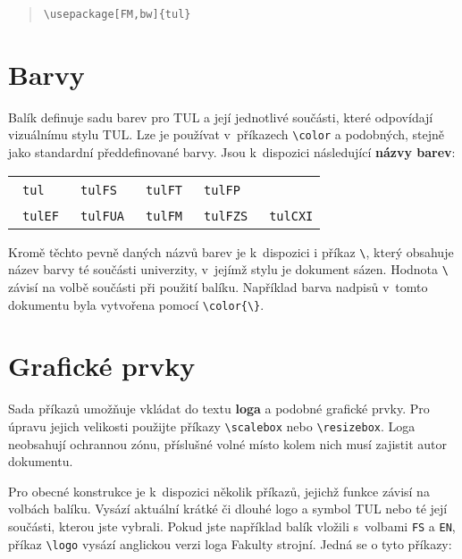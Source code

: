 \documentclass[a4paper,12pt,fonts,numbering]{./tulpackage/tularticle}
\makeatletter
\newcommand{\cmdfont}[1]{\texttt{\color{\tulcolor}#1}}
\newcommand{\cmdnoindex}[1]{\cmdfont{\textbackslash #1}}
\newcommand{\cmd}[1]{\cmdnoindex{#1}\index{#1@\textbackslash #1}}
\newcommand{\demobox}{\raisebox{-.20ex}{\rule{1em}{1em}}}
\makeatother
\begin{document}
\begin{quote}
\cmdnoindex{usepackage[FM,bw]\{tul\}}
\end{quote}

\section{Barvy}

Balík definuje sadu barev pro TUL a její jednotlivé součásti, které odpovídají
vizuálnímu stylu TUL. Lze je používat v~příkazech \cmdnoindex{color} a podobných,
stejně jako standardní předdefinované barvy. Jsou k~dispozici následující
\textbf{názvy barev}:

\begin{center}
\begin{tabular}{l@{\qquad}l@{\qquad}l@{\qquad}l@{\qquad}l}
{\color{tul}\demobox}\ \cmdfont{tul} &
{\color{tulFS}\demobox}\ \cmdfont{tulFS} &
{\color{tulFT}\demobox}\ \cmdfont{tulFT} &
{\color{tulFP}\demobox}\ \cmdfont{tulFP} \\
{\color{tulEF}\demobox}\ \cmdfont{tulEF} &
{\color{tulFUA}\demobox}\ \cmdfont{tulFUA} &
{\color{tulFM}\demobox}\ \cmdfont{tulFM} &
{\color{tulFZS}\demobox}\ \cmdfont{tulFZS} &
{\color{tulCXI}\demobox}\ \cmdfont{tulCXI}
\end{tabular}
\end{center}

Kromě těchto pevně daných názvů barev je k~dispozici i příkaz \cmd{\tulcolor},
který obsahuje název barvy té součásti univerzity, v~jejímž stylu je dokument
sázen. Hodnota \cmd{\tulcolor} závisí na volbě součásti při použití balíku.
Například barva nadpisů v~tomto dokumentu byla vytvořena pomocí
\cmdnoindex{color\{\textbackslash \tulcolor\}}.

\clearpage

\section{Grafické prvky}

Sada příkazů umožňuje vkládat do textu \textbf{loga} a podobné grafické prvky. Pro
úpravu jejich velikosti použijte příkazy \cmdnoindex{scalebox} nebo
\cmdnoindex{resizebox}. Loga neobsahují ochrannou zónu, příslušné volné místo
kolem nich musí zajistit autor dokumentu.

Pro obecné konstrukce je k~dispozici několik příkazů, jejichž funkce závisí na
volbách balíku. Vysází aktuální krátké či dlouhé logo a symbol TUL nebo té její
součásti, kterou jste vybrali. Pokud jste například balík vložili s~volbami
\cmdfont{FS} a \cmdfont{EN}, příkaz \cmd{logo} vysází anglickou verzi loga
Fakulty strojní. Jedná se o tyto příkazy:
\end{document}

